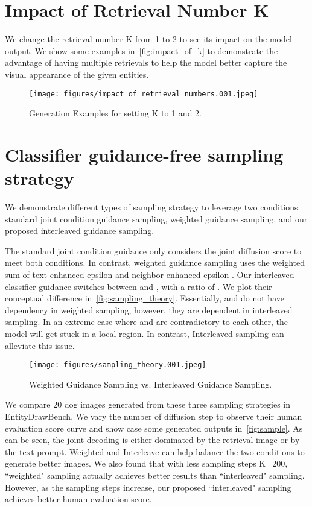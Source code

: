 \documentclass{article} \usepackage{iclr2023_conference,times}
\begin{document}
\clearpage
\section{Impact of Retrieval Number K}
\label{appendix:impact_of_k}
We change the retrieval number K from 1 to 2 to see its impact on the model output. We show some examples in~\autoref{fig:impact_of_k} to demonstrate the advantage of having multiple retrievals to help the model better capture the visual appearance of the given entities.  
\begin{figure}[!h]
    \centering
    \texttt{[image: figures/impact\_of\_retrieval\_numbers.001.jpeg]}
    \caption{Generation Examples for setting K to 1 and 2. }
    \vspace{-1ex}
    \label{fig:impact_of_k}
\end{figure}

\clearpage
\section{Classifier guidance-free sampling strategy}
We demonstrate different types of sampling strategy to leverage two conditions: standard joint condition guidance sampling, weighted guidance sampling, and our proposed interleaved guidance sampling. 

The standard joint condition guidance only considers the joint diffusion score  to meet both conditions. In contrast, weighted guidance sampling uses the weighted sum of text-enhanced epsilon  and neighbor-enhanced epsilon . Our interleaved classifier guidance switches between  and , with a ratio of . We plot their conceptual difference in~\autoref{fig:sampling_theory}. Essentially,  and  do not have dependency in weighted sampling, however, they are dependent in interleaved sampling. In an extreme case where  and  are contradictory to each other, the model will get stuck in a local region. In contrast, Interleaved sampling can alleviate this issue.

\begin{figure}[!h]
    \centering
    \texttt{[image: figures/sampling\_theory.001.jpeg]}
    \caption{Weighted Guidance Sampling vs. Interleaved Guidance Sampling. }
    \vspace{-1ex}
    \label{fig:sampling_theory}
\end{figure}


We compare 20 dog images generated from these three sampling strategies in EntityDrawBench. We vary the number of diffusion step to observe their human evaluation score curve and show case some generated outputs in~\autoref{fig:sample}. As can be seen, the joint decoding is either dominated by the retrieval image or by the text prompt. Weighted and Interleave can help balance the two conditions to generate better images. We also found that with less sampling steps K=200, ``weighted" sampling actually achieves better results than ``interleaved" sampling. However, as the sampling steps increase, our proposed ``interleaved" sampling achieves better human evaluation score. 
\end{document}
